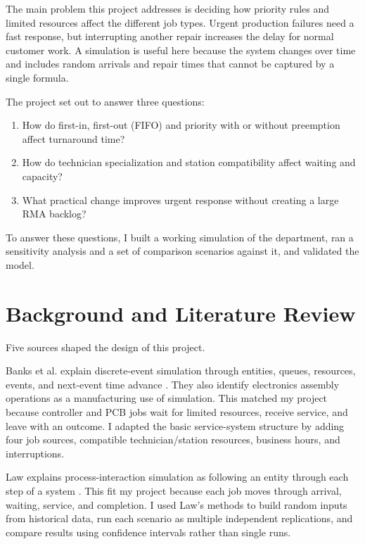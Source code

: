 \documentclass[12pt, letterpaper, twoside]{article}
\begin{document}
The main problem this project addresses is deciding how priority rules and limited
resources affect the different job types. Urgent production failures need a fast
response, but interrupting another repair increases the delay for normal customer work.
A simulation is useful here because the system changes over time and includes random
arrivals and repair times that cannot be captured by a single formula.

The project set out to answer three questions:

\begin{enumerate}
    \item How do first-in, first-out (FIFO) and priority with or without preemption affect turnaround time?
    \item How do technician specialization and station compatibility affect waiting and capacity?
    \item What practical change improves urgent response without creating a large RMA backlog?
\end{enumerate}

To answer these questions, I built a working simulation of the department, ran a
sensitivity analysis and a set of comparison scenarios against it, and validated the
model. 

\section{Background and Literature Review}
\label{sec:literature}

Five sources shaped the design of this project.

Banks et al. explain discrete-event simulation through entities, queues, resources,
events, and next-event time advance \cite{banks2005}. They also identify electronics
assembly operations as a manufacturing use of simulation. This matched my project because
controller and PCB jobs wait for limited resources, receive service, and leave with an
outcome. I adapted the basic service-system structure by adding four job sources,
compatible technician/station resources, business hours, and interruptions.

Law explains process-interaction simulation as following an entity through each step of a
system \cite{law2015}. This fit my project because each job moves through arrival,
waiting, service, and completion. I used Law's methods to build random inputs from
historical data, run each scenario as multiple independent replications, and compare
results using confidence intervals rather than single runs.
\end{document}
